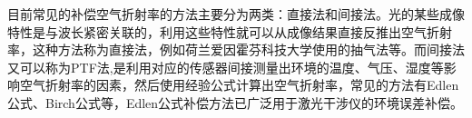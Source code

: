 目前常见的补偿空气折射率的方法主要分为两类：直接法和间接法。光的某些成像特性是与波长紧密关联的，利用这些特性就可以从成像结果直接反推出空气折射率，这种方法称为直接法，例如荷兰爱因霍芬科技大学使用的抽气法等。而间接法又可以称为PTF法\cite{高精度空气折射率测量系统设计与实现},是利用对应的传感器间接测量出环境的温度、气压、湿度等影响空气折射率的因素，然后使用经验公式计算出空气折射率，常见的方法有Edlen公式、Birch公式等，Edlen公式补偿方法已广泛用于激光干涉仪的环境误差补偿。
